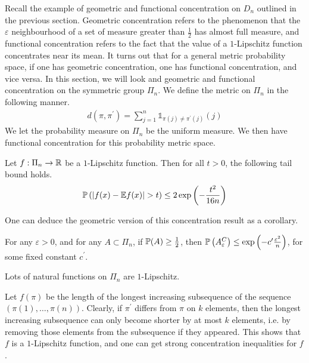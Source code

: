 \documentclass[11pt]{article}
\begin{document}
Recall the example of geometric and functional concentration on $D_n$ outlined in the previous section.
Geometric concentration refers to the phenomenon that the $\varepsilon$ neighbourhood of a set of measure greater than $\frac{1}{2}$ has almost full measure, and functional concentration refers to the fact that the value of a $1$-Lipschitz function concentrates near its mean.
It turns out that for a general metric probability space, if one has geometric concentration, one has functional concentration, and vice versa.
In this section, we will look and geometric and functional concentration on the symmetric group $\Pi_n$.
We define the metric on $\Pi_n$ in the following manner.
\begin{align*}
  d(\pi, \pi^{\prime}) = \sum_{j=1}^n \mathbb{1}_{\pi(j) \neq \pi^{\prime}(j)}(j)
\end{align*}
We let the probability measure on $\Pi_n$ be the uniform measure.
We then have functional concentration for this probability metric space.
\begin{theorem}
  \label{thm:maurey}
  Let $f: \Pi_n \to \R$ be a $1$-Lipschitz function. Then for all $t > 0$, the following tail bound holds.
  \begin{align*}
    \P\left( \left| f(x) - \E f(x) \right| > t \right) \leq 2 \exp\left( - \frac{t^2}{16n} \right)
  \end{align*}
\end{theorem}
One can deduce the geometric version of this concentration result as a corollary.
\begin{corollary}
  For any $\varepsilon > 0$, and for any $A \subset \Pi_n$, if $\P(A) \geq \frac{1}{2}$,
  then $\P\left( A_\varepsilon^C \right) \leq \exp\left( -c^{\prime} \frac{\varepsilon^2}{n} \right)$, for some fixed constant $c^{\prime}$.
\end{corollary}

Lots of natural functions on $\Pi_n$ are $1$-Lipschitz.
\begin{example}
  Let $f(\pi)$ be the length of the longest increasing subsequence of the sequence $\left( \pi(1), \ldots, \pi(n) \right)$.
  Clearly, if $\pi^{\prime}$ differs from $\pi$ on $k$ elements, then the longest increasing subsequence can only become shorter by at most $k$ elements, i.e. by removing those elements from the subsequence if they appeared.
  This shows that $f$ is a $1$-Lipschitz function, and one can get strong concentration inequalities for $f$.
\end{example}
\end{document}
